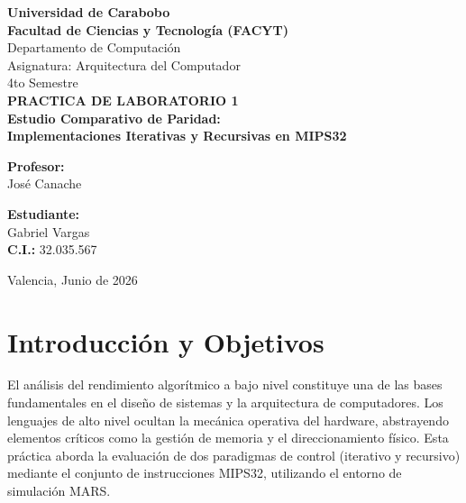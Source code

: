 \documentclass[12pt,letterpaper]{article}
\begin{document}
\begin{titlepage}
    \centering
    {\bfseries\LARGE Universidad de Carabobo}\\
    [0.4cm]
    {\bfseries\Large Facultad de Ciencias y Tecnología (FACYT)}\\
    [0.4cm]
    {\large Departamento de Computación \\ Asignatura: Arquitectura del Computador \\ 4to Semestre}\\
    \vfill
    {\Huge \bfseries PRACTICA DE LABORATORIO 1}\\
    [0.6cm]
    {\Large \bfseries Estudio Comparativo de Paridad:\\ Implementaciones Iterativas y Recursivas en MIPS32}\\
    \vfill
    
    \noindent
    \begin{minipage}[t]{0.45\textwidth}
        \large
        \textbf{Profesor:}\\
        José Canache
    \end{minipage}
    \hfill
    \begin{minipage}[t]{0.45\textwidth}
        \large
        \begin{flushright}
            \textbf{Estudiante:}\\
            Gabriel Vargas\\
            \textbf{C.I.:} 32.035.567
        \end{flushright}
    \end{minipage}
    
    \vfill
    {\large Valencia, Junio de 2026}
\end{titlepage}

\newpage

\section{Introducción y Objetivos}

El análisis del rendimiento algorítmico a bajo nivel constituye una de las bases fundamentales en el diseño de sistemas y la arquitectura de computadores. Los lenguajes de alto nivel ocultan la mecánica operativa del hardware, abstrayendo elementos críticos como la gestión de memoria y el direccionamiento físico. Esta práctica aborda la evaluación de dos paradigmas de control (iterativo y recursivo) mediante el conjunto de instrucciones MIPS32, utilizando el entorno de simulación MARS.
\end{document}
